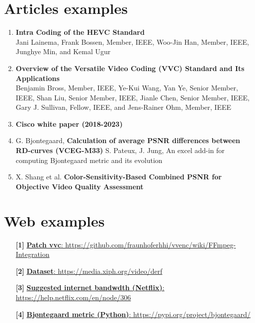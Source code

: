 \section{Articles examples}
\begin{enumerate}
    \item \textbf{Intra Coding of the HEVC Standard}\\
    Jani Lainema, Frank Bossen, Member, IEEE, Woo-Jin Han, Member, IEEE, Junghye Min, and Kemal Ugur
    \item \textbf{Overview of the Versatile Video Coding (VVC) Standard and Its Applications}\\
    Benjamin Bross, Member, IEEE, Ye-Kui Wang, Yan Ye, Senior Member, IEEE, Shan Liu, Senior Member, IEEE, Jianle Chen, Senior Member, IEEE, Gary J. Sullivan, Fellow, IEEE, and Jens-Rainer Ohm, Member, IEEE
    \item \textbf{Cisco white paper (2018-2023)}
    \item G. Bjontegaard, \textbf{Calculation of average PSNR differences between RD-curves (VCEG-M33)} S. Pateux, J. Jung, An excel add-in for computing Bjontegaard metric and its evolution
    \item X. Shang et al. \textbf{Color-Sensitivity-Based Combined PSNR for Objective Video Quality Assessment}
\end{enumerate}

\section{Web examples}
\begin{enumerate}
    \item[\textbf{[1]}]\href{https://github.com/fraunhoferhhi/vvenc/wiki/FFmpeg-Integration}{\textbf{Patch vvc}: https://github.com/fraunhoferhhi/vvenc/wiki/FFmpeg-Integration}
    \item[\textbf{[2]}]\href{https://media.xiph.org/video/derf/}{\textbf{Dataset}: https://media.xiph.org/video/derf}
    \item[\textbf{[3]}]\href{https://help.netflix.com/en/node/306}{\textbf{Suggested internet bandwdth (Netflix)}: https://help.netflix.com/en/node/306}
    \item[\textbf{[4]}]\href{https://pypi.org/project/bjontegaard/}{\textbf{Bj\o ntegaard metric (Python)}: https://pypi.org/project/bjontegaard/}
\end{enumerate}
